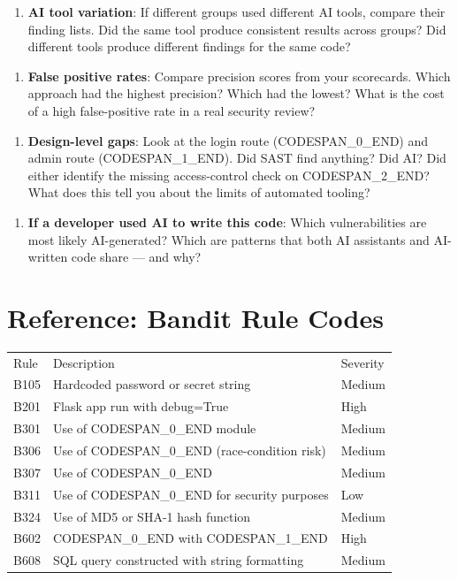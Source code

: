 \documentclass[11pt,a4paper]{book}
\begin{document}
\begin{enumerate}
  \item \textbf{AI tool variation}: If different groups used different AI tools, compare their finding lists. Did the same tool produce consistent results across groups? Did different tools produce different findings for the same code?
\end{enumerate}

\begin{enumerate}
  \item \textbf{False positive rates}: Compare precision scores from your scorecards. Which approach had the highest precision? Which had the lowest? What is the cost of a high false-positive rate in a real security review?
\end{enumerate}

\begin{enumerate}
  \item \textbf{Design-level gaps}: Look at the login route (CODESPAN\_0\_END) and admin route (CODESPAN\_1\_END). Did SAST find anything? Did AI? Did either identify the missing access-control check on CODESPAN\_2\_END? What does this tell you about the limits of automated tooling?
\end{enumerate}

\begin{enumerate}
  \item \textbf{If a developer used AI to write this code}: Which vulnerabilities are most likely AI-generated? Which are patterns that both AI assistants and AI-written code share --- and why?
\end{enumerate}

\medskip

\section{Reference: Bandit Rule Codes}

\begin{tabular}{lll}
\hline
Rule & Description & Severity \\
B105 & Hardcoded password or secret string & Medium \\
B201 & Flask app run with debug=True & High \\
B301 & Use of CODESPAN\_0\_END module & Medium \\
B306 & Use of CODESPAN\_0\_END (race-condition risk) & Medium \\
B307 & Use of CODESPAN\_0\_END & Medium \\
B311 & Use of CODESPAN\_0\_END for security purposes & Low \\
B324 & Use of MD5 or SHA-1 hash function & Medium \\
B602 & CODESPAN\_0\_END with CODESPAN\_1\_END & High \\
B608 & SQL query constructed with string formatting & Medium \\
\hline
\end{tabular}
\end{document}
